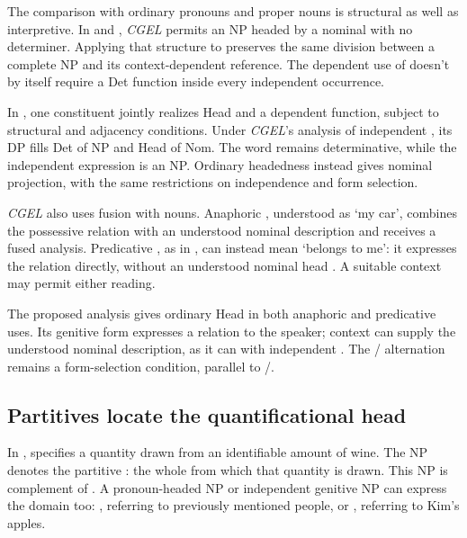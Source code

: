 \documentclass[12pt]{article}
\begin{document}
The comparison with ordinary pronouns and proper nouns is structural as well as interpretive. In  and , \textit{CGEL} permits an NP headed by a nominal with no determiner. Applying that structure to  preserves the same division between a complete NP and its context-dependent reference. The dependent use of  doesn't by itself require a Det function inside every independent occurrence.

In \textcite{Payne2007}, one constituent jointly realizes Head and a dependent function, subject to structural and adjacency conditions. Under \textit{CGEL}'s analysis of independent , its DP fills Det of NP and Head of Nom. The word remains determinative, while the independent expression is an NP. Ordinary headedness instead gives  nominal projection, with the same restrictions on independence and form selection.

\textit{CGEL} also uses fusion with nouns. Anaphoric , understood as \enquote*{my car}, combines the possessive relation with an understood nominal description and receives a fused analysis. Predicative , as in , can instead mean \enquote*{belongs to me}: it expresses the relation directly, without an understood nominal head \citep[410--411, 470--471]{huddleston2002}. A suitable context may permit either reading.

The proposed analysis gives  ordinary Head in both anaphoric and predicative uses. Its genitive form expresses a relation to the speaker; context can supply the understood nominal description, as it can with independent . The / alternation remains a form-selection condition, parallel to /.

\subsection{Partitives locate the quantificational head}

In ,  specifies a quantity drawn from an identifiable amount of wine. The NP  denotes the partitive : the whole from which that quantity is drawn. This NP is complement of . A pronoun-headed NP or independent genitive NP can express the domain too: , referring to previously mentioned people, or , referring to Kim's apples.
\end{document}
